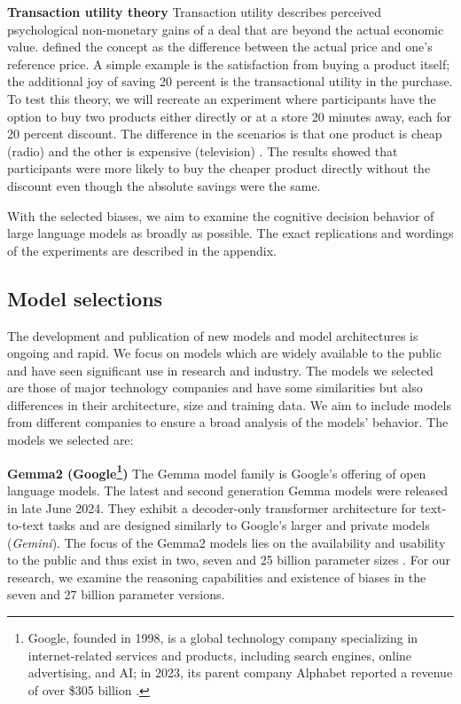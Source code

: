\par \textbf{Transaction utility theory} Transaction utility describes perceived psychological non-monetary gains of a deal that are beyond the actual economic value. \textcite{thaler1983transaction} defined the concept as the difference between the actual price and one's reference price. A simple example is the satisfaction from buying a product itself; the additional joy of saving 20 percent is the transactional utility in the purchase. To test this theory, we will recreate an experiment where participants have the option to buy two products either directly or at a store 20 minutes away, each for 20 percent discount. The difference in the scenarios is that one product is cheap (radio) and the other is expensive (television) \parencite{thaler1983transaction}. The results showed that participants were more likely to buy the cheaper product directly without the discount even though the absolute savings were the same.

\setlength{\parindent}{0pt}
\par With the selected biases, we aim to examine the cognitive decision behavior of large language models as broadly as possible. The exact replications and wordings of the experiments are described in the appendix.


\subsection{Model selections}
\par The development and publication of new models and model architectures is ongoing and rapid. We focus on models which are widely available to the public and have seen significant use in research and industry. The models we selected are those of major technology companies and have some similarities but also differences in their architecture, size and training data. We aim to include models from different companies to ensure a broad analysis of the models' behavior. The models we selected are:

\setlength{\parindent}{20pt}
\par \textbf{Gemma2 (Google\footnote{Google, founded in 1998, is a global technology company specializing in internet-related services and products, including search engines, online advertising, and AI; in 2023, its parent company Alphabet reported a revenue of over \$305 billion \parencite{alphabet2023annual}.})} The Gemma model family is Google's offering of open language models. The latest and second generation Gemma models were released in late June 2024. They exhibit a decoder-only transformer architecture for text-to-text tasks and are designed similarly to Google's larger and private models (\textit{Gemini}). The focus of the Gemma2 models lies on the availability and usability to the public and thus exist in two, seven and 25 billion parameter sizes \parencite{team2024gemma}. For our research, we examine the reasoning capabilities and existence of biases in the seven and 27 billion parameter versions.

